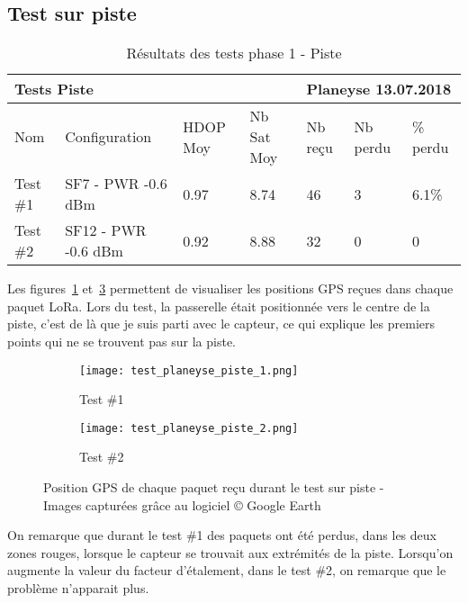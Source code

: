\subsection{Test sur piste}

\begin{table}[htb]
\caption[Résultats des tests phase 1 - Piste]{Résultats des tests phase 1 - Piste}
\label{tab:resultat_test_1_piste}
\centering
\begin{tabular}{lllllll}
\toprule
\multicolumn{4}{l}{ Tests Piste } & \multicolumn{3}{l}{ Planeyse 13.07.2018 } \\
\toprule
Nom & Configuration & HDOP Moy & Nb Sat Moy & Nb reçu & Nb perdu & \% perdu \\
\midrule
Test \#1 & SF7 - PWR -0.6 dBm & 0.97 & 8.74 & 46 & 3 & 6.1\% \\
Test \#2 & SF12 - PWR -0.6 dBm & 0.92 & 8.88 & 32 & 0 & 0  \\
\bottomrule 
\end{tabular}
\end{table}

Les figures~\ref{fig:test_piste_1} et~\ref{fig:test_piste_2} permettent de visualiser les positions GPS reçues dans chaque paquet LoRa. Lors du test, la passerelle était positionnée vers le centre de la piste, c'est de là que je suis parti avec le capteur, ce qui explique les premiers points qui ne se trouvent pas sur la piste.

\begin{figure}[htb]
\label{tab:resultat_tests_piste}
\centering
\begin{subfigure}[b]{1\textwidth}
   \texttt{[image: test\_planeyse\_piste\_1.png]}
   \caption{Test \#1}
   \label{fig:test_piste_1}
\end{subfigure}

\begin{subfigure}[b]{1\textwidth}
   \texttt{[image: test\_planeyse\_piste\_2.png]}
   \caption{Test \#2}
   \label{fig:test_piste_2}
\end{subfigure}
\caption[Positions GPS des tests piste]{Position GPS de chaque paquet reçu durant le test sur piste - Images capturées grâce au logiciel © Google Earth}
\end{figure}

On remarque que durant le test \#1 des paquets ont été perdus, dans les deux zones rouges, lorsque le capteur se trouvait aux extrémités de la piste. Lorsqu'on augmente la valeur du facteur d'étalement, dans le test \#2, on remarque que le problème n'apparait plus.

